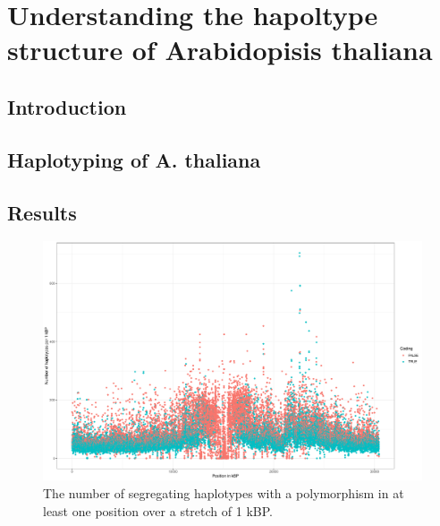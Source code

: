 
\chapter{Understanding the hapoltype structure of Arabidopisis thaliana } %

\label{Chapter1} %




\section{Introduction}

\section{Haplotyping of A. thaliana}

\section{Results}

\begin{figure}[th]
\centering
\includegraphics[height=.55\textheight, width=1.1\textwidth]{Figures/chr1_hap}
\decoRule
\caption[Haplotype strutcture of chromosome 1 of \textit{A. thaliana}]{The number of segregating haplotypes with a polymorphism in at least one position over a stretch of 1 kBP. }
\label{fig:chr1}
\end{figure}



